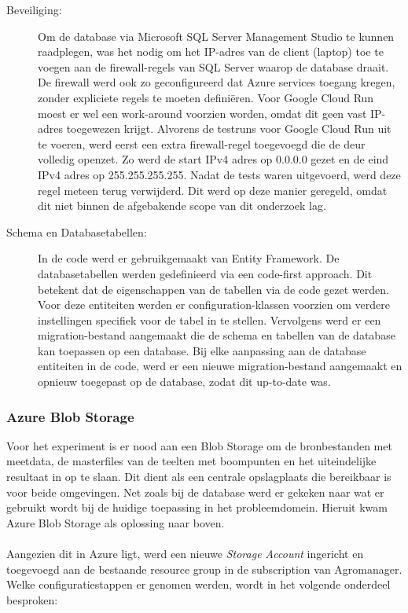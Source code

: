 \begin{description}
    \item[Beveiliging:]
    Om de database via Microsoft SQL Server Management Studio te kunnen raadplegen, was het nodig om het IP-adres van de client (laptop) toe te voegen aan de firewall-regels van SQL Server waarop de database draait. De firewall werd ook zo geconfigureerd dat Azure services toegang kregen, zonder expliciete regels te moeten definiëren. Voor Google Cloud Run moest er wel een work-around voorzien worden, omdat dit geen vast IP-adres toegewezen krijgt. Alvorens de testruns voor Google Cloud Run uit te voeren, werd eerst een extra firewall-regel toegevoegd die de deur volledig openzet. Zo werd de start IPv4 adres op 0.0.0.0 gezet en de eind IPv4 adres op 255.255.255.255. Nadat de tests waren uitgevoerd, werd deze regel meteen terug verwijderd. Dit werd op deze manier geregeld, omdat dit niet binnen de afgebakende scope van dit onderzoek lag. 
    \item[Schema en Databasetabellen:]
    In de code werd er gebruikgemaakt van Entity Framework. De databasetabellen werden gedefinieerd via een code-first approach. Dit betekent dat de eigenschappen van de tabellen via de code gezet werden. Voor deze entiteiten werden er configuration-klassen voorzien om verdere instellingen specifiek voor de tabel in te stellen. Vervolgens werd er een migration-bestand aangemaakt die de schema en tabellen van de database kan toepassen op een database. Bij elke aanpassing aan de database entiteiten in de code, werd er een nieuwe migration-bestand aangemaakt en opnieuw toegepast op de database, zodat dit up-to-date was.
\end{description}

\subsubsection*{Azure Blob Storage}

Voor het experiment is er nood aan een Blob Storage om de bronbestanden met meetdata, de masterfiles van de teelten met boompunten en het uiteindelijke resultaat in op te slaan. Dit dient als een centrale opslagplaats die bereikbaar is voor beide omgevingen. Net zoals bij de database werd er gekeken naar wat er gebruikt wordt bij de huidige toepassing in het probleemdomein. Hieruit kwam Azure Blob Storage als oplossing naar boven.  
\\
\\
Aangezien dit in Azure ligt, werd een nieuwe \textit{Storage Account} ingericht en toegevoegd aan de bestaande resource group in de subscription van Agromanager. Welke configuratiestappen er genomen werden, wordt in het volgende onderdeel besproken:

